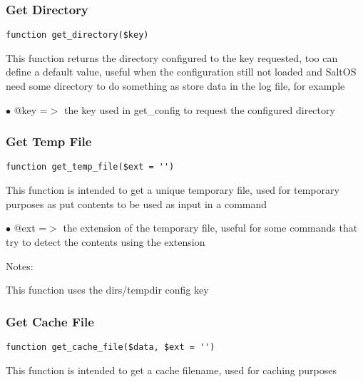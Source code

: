 \documentclass[a4paper]{article}
\begin{document}
\hypertarget{toc128}{}
\subsubsection{Get Directory}

\begin{lstlisting}
function get_directory($key)
\end{lstlisting}

This function returns the directory configured to the key requested, too can define a default
value, useful when the configuration still not loaded and SaltOS need some directory to do
something as store data in the log file, for example

\begin{compactitem}
\item[\color{myblue}$\bullet$] @key =$>$ the key used in get\_config to request the configured directory
\end{compactitem}

\hypertarget{toc129}{}
\subsubsection{Get Temp File}

\begin{lstlisting}
function get_temp_file($ext = '')
\end{lstlisting}

This function is intended to get a unique temporary file, used for temporary
purposes as put contents to be used as input in a command

\begin{compactitem}
\item[\color{myblue}$\bullet$] @ext =$>$ the extension of the temporary file, useful for some commands that
        try to detect the contents using the extension
\end{compactitem}

Notes:

This function uses the dirs/tempdir config key

\hypertarget{toc130}{}
\subsubsection{Get Cache File}

\begin{lstlisting}
function get_cache_file($data, $ext = '')
\end{lstlisting}

This function is intended to get a cache filename, used for caching purposes
\end{document}
